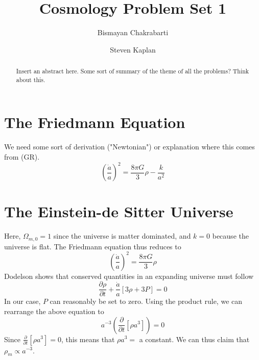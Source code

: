 \documentclass[aps,reprint,prl]{revtex4-1}
\begin{document}
\title{Cosmology Problem Set 1}
\author{Bismayan Chakrabarti}
\author{Steven Kaplan}

\begin{abstract}
Insert an abstract here. Some sort of summary of the theme of all the problems? Think about this.
\end{abstract}

\maketitle

\section*{The Friedmann Equation}
We need some sort of derivation ("Newtonian") or explanation where this comes from (GR).
\begin{equation}
\left(\frac{\dot{a}}{a}\right)^2=\frac{8\pi G}{3}\rho-\frac{k}{a^2}
\end{equation}
\section*{The Einstein-de Sitter Universe}
Here, $\Omega_{m,0}=1$ since the universe is matter dominated, and $k=0$ because the universe is flat.  The Friedmann equation thus reduces to
\begin{equation}
\left(\frac{\dot{a}}{a}\right)^2=\frac{8\pi G}{3}\rho
\end{equation}
Dodelson shows that conserved quantities in an expanding universe must follow
\begin{equation}
\frac{\partial \rho}{\partial t} + \frac{\dot{a}}{a}\left[3\rho+3P\right]=0
\end{equation}
In our case, $P$ can reasonably be set to zero.  Using the product rule, we can rearrange the above equation to
\begin{equation}
a^{-3}\left(\frac{\partial}{\partial t}\left[\rho a^3\right]\right)=0
\end{equation}
Since $\frac{\partial}{\partial t}\left[\rho a^{3}\right]=0$, this means that $\rho a^{3}=$ a constant.  We can thus claim that $\rho_m \propto a^{-3}$.
\end{document}
